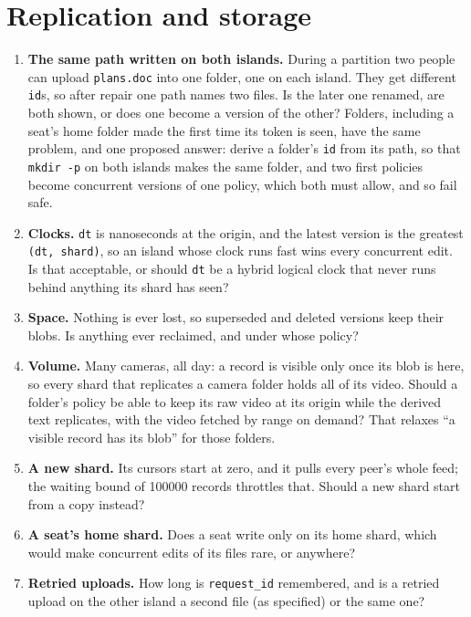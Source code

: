 \section{Replication and storage}
\begin{enumerate}
\item \textbf{The same path written on both islands.} During a partition two
  people can upload \texttt{plans.doc} into one folder, one on each island. They
  get different \texttt{id}s, so after repair one path names two files. Is the
  later one renamed, are both shown, or does one become a version of the other?
  Folders, including a seat's home folder made the first time its token is seen,
  have the same problem, and one proposed answer: derive a folder's \texttt{id}
  from its path, so that \texttt{mkdir -p} on both islands makes the same folder,
  and two first policies become concurrent versions of one policy, which both
  must allow, and so fail safe.
\item \textbf{Clocks.} \texttt{dt} is nanoseconds at the origin, and the latest
  version is the greatest \texttt{(dt, shard)}, so an island whose clock runs fast
  wins every concurrent edit. Is that acceptable, or should \texttt{dt} be a
  hybrid logical clock that never runs behind anything its shard has seen?
\item \textbf{Space.} Nothing is ever lost, so superseded and deleted versions keep
  their blobs. Is anything ever reclaimed, and under whose policy?
\item \textbf{Volume.} Many cameras, all day: a record is visible only once its
  blob is here, so every shard that replicates a camera folder holds all of its
  video. Should a folder's policy be able to keep its raw video at its origin
  while the derived text replicates, with the video fetched by range on demand?
  That relaxes ``a visible record has its blob'' for those folders.
\item \textbf{A new shard.} Its cursors start at zero, and it pulls every peer's
  whole feed; the waiting bound of 100000 records throttles that. Should a new
  shard start from a copy instead?
\item \textbf{A seat's home shard.} Does a seat write only on its home shard,
  which would make concurrent edits of its files rare, or anywhere?
\item \textbf{Retried uploads.} How long is \texttt{request\_id} remembered, and
  is a retried upload on the other island a second file (as specified) or the
  same one?
\end{enumerate}

